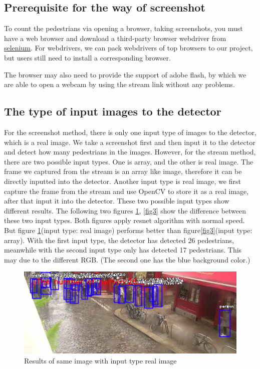 \documentclass[runningheads]{llncs}
\begin{document}
\subsection{Prerequisite for the way of screenshot}
To count the pedestrians via opening a browser, taking screenshots, you must have a web browser and download a third-party browser webdriver from \href{https://www.seleniumhq.org/download/}{selenium}. For webdrivers, we can pack webdrivers of top browsers to our project, but users still need to install a corresponding browser.

The browser may also need to provide the support of adobe flash, by which we are able to open a webcam by using the stream link without any problems.

\subsection{The type of input images to the detector}
For the screenshot method, there is only one input type of images to the detector, which is a real image. We take a screenshot first and then input it to the detector and detect how many pedestrians in the images. However, for the stream method, there are two possible input types. One is array, and the other is real image. The frame we captured from the stream is an array like image, therefore it can be directly inputted into the detector. Another input type is real image, we first capture the frame from the stream and use OpenCV to store it as a real image, after that input it into the detector. These two possible input types show different results. The following two figures \ref{fig2}, \ref{fig3} show the difference between these two input types. Both figures apply resnet algorithm with normal speed. But figure \ref{fig2}(input type: real image) performs better than figure\ref{fig3}(input type: array). With the first input type, the detector has detected 26 pedestrians, meanwhile with the second input type only has detected 17 pedestrians. This may due to the different RGB. (The second one has the blue background color.) 
\begin{figure}
\includegraphics[width=\textwidth]{figs/problem_imgtype1.png}
\caption{Results of same image with input type real image} \label{fig2}
\end{figure}
\end{document}
